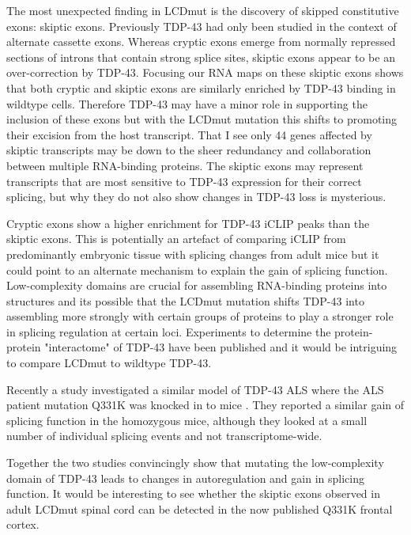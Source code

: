 The most unexpected finding in LCDmut is the discovery of skipped constitutive exons: skiptic exons. 
Previously TDP-43 had only been studied in the context of alternate cassette exons.
Whereas cryptic exons emerge from normally repressed sections of introns that contain strong splice sites, skiptic exons appear to be an over-correction by TDP-43.
Focusing our RNA maps on these skiptic exons shows that both cryptic and skiptic exons are similarly enriched by TDP-43 binding in wildtype cells.
Therefore TDP-43 may have a minor role in supporting the inclusion of these exons but with the LCDmut mutation this shifts to promoting their excision from the host transcript.
That I see only 44 genes affected by skiptic transcripts may be down to the sheer redundancy and collaboration between multiple RNA-binding proteins. 
The skiptic exons may represent transcripts that are most sensitive to TDP-43 expression for their correct splicing, but why they do not also show changes in TDP-43 loss is mysterious.

Cryptic exons show a higher enrichment for TDP-43 iCLIP peaks than the skiptic exons. 
This is potentially an artefact of comparing iCLIP from predominantly embryonic tissue with splicing changes from adult mice but it could point to an alternate mechanism to explain the gain of splicing function.
Low-complexity domains are crucial for assembling RNA-binding proteins into structures  \cite{Gueroussov2017} and its possible that the LCDmut mutation shifts TDP-43 into assembling more strongly with certain groups of proteins to play a stronger role in splicing regulation at certain loci. 
Experiments to determine the protein-protein "interactome" of TDP-43 have been published \citep{Freibaum2010-hw} and it would be intriguing to compare LCDmut to wildtype TDP-43. 

Recently a study investigated a similar model of TDP-43 ALS where the ALS patient mutation Q331K was knocked in to mice \citep{White2018}. 
They reported a similar gain of splicing function in the homozygous mice, although they looked at a small number of individual splicing events and not transcriptome-wide.


Together the two studies convincingly show that mutating the low-complexity domain of TDP-43 leads to changes in autoregulation and gain in splicing function.
It would be interesting to see whether the skiptic exons observed in adult LCDmut spinal cord can be detected in the now published Q331K frontal cortex.
 
